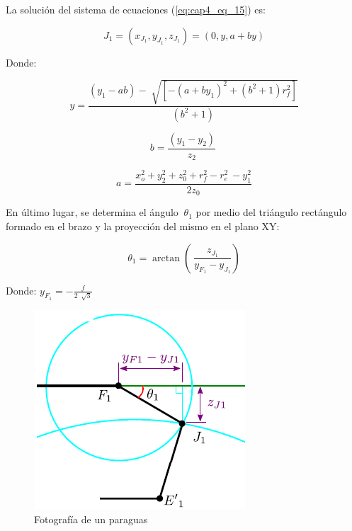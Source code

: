 La solución del sistema de ecuaciones (\ref{eq:cap4_eq_15}) es:

    \begin{equation}
    J_{1}= \left( x_{J_{1}},y_{J_{1}},z_{J_{1}} \right) = \left( 0,y,a+by \right)
    \label{eq:cap4_eq_16}
    \end{equation}

    Donde:

    \begin{equation}
        y=\frac{\left( y_{1}-ab \right) -\sqrt[]{ \left[  -\left( a+by_{1} \right) ^{2}+ \left( b^{2}+1 \right) r_{f}^{2} \right] }}{ \left( b^{2}+1 \right) }
    \label{eq:cap4_eq_17}
    \end{equation}

    \begin{equation}
        b=\frac{ \left( y_{1}-y_{2} \right) }{z_{2}}~ 
    \label{eq:cap4_eq_18}
    \end{equation}
    
    \begin{equation}
        a= \frac{x_{o}^{2}+y_{2}^{2}+z_{0}^{2}+r_{f}^{2}- r_{e}^{2}~-y_{1}^{2}}{2z_{0}} 
    \label{eq:cap4_eq_19}
    \end{equation}

                \newpage

En último lugar, se determina el ángulo \( ~ \theta _{1} \)  por medio del triángulo rectángulo formado en el brazo y la proyección del mismo en el plano XY:

    \begin{equation}
        \theta _{1}=\arctan  \left( ~\frac{z_{J_{1}}}{y_{F_{1}}-y_{J_{1}}} \right)  
        \label{eq:cap4_eq_20}
    \end{equation}
    
    Donde:  \( y_{F_{1}}= - \frac{f}{2~\sqrt[]{3}} \)

    
        \begin{figure}[htb]
             \centering
             \includegraphics[width=0.4\linewidth]{Main/Chapter4/Images4/DIBUJO4.png}
              \caption{Fotografía de un paraguas}
              \label{f:Cap4_Metodo_A_Modelacion_Cinematica_Posicion_5}
        \end{figure}





